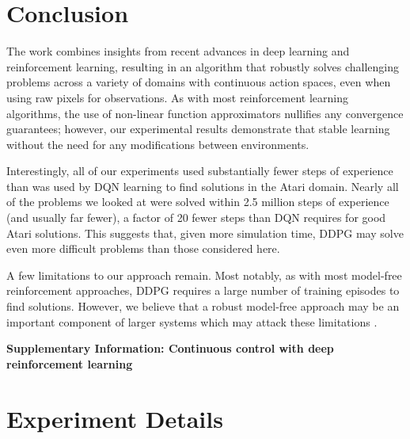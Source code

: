 \documentclass{article} \usepackage{iclr2016_conference,times}
\begin{document}
\section{Conclusion}

The work combines insights from recent advances in deep
learning and reinforcement learning, resulting in an algorithm that
robustly solves challenging problems across a variety of domains with
continuous action spaces, even when using raw pixels for observations.
As with most reinforcement learning algorithms, the
use of non-linear function approximators nullifies any convergence
guarantees; however, our experimental results demonstrate that stable
learning without the need for any modifications between environments.

Interestingly, all of our experiments used substantially fewer steps
of experience than was used by DQN learning to find solutions in the
Atari domain.  Nearly all of the problems we looked at were solved
within 2.5 million steps of experience (and usually far fewer), a
factor of 20 fewer steps than DQN requires for good Atari solutions.
This suggests that, given more simulation time, DDPG may solve
even more difficult problems than those considered here.

A few limitations to our approach remain. Most notably, as with most
model-free reinforcement approaches, DDPG requires a large number of
training episodes to find solutions. However, we believe that a robust
model-free approach may be an important component of larger systems
which may attack these limitations \citep{glascher2010states}.











\newpage

\begin{center}
{\LARGE\bf Supplementary Information: Continuous control with deep
  reinforcement learning}
\end{center}

\section{Experiment Details}
\end{document}
